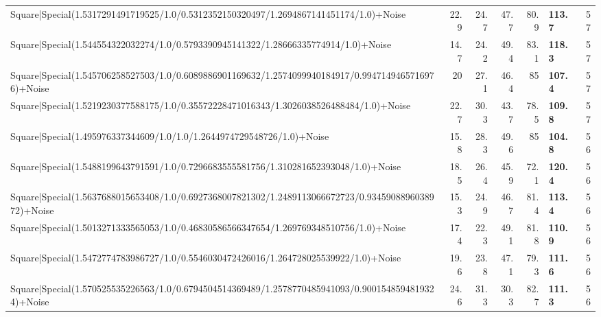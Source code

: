\begin{tabular}{lrrrrlr}
 Square|Special(1.5317291491719525/1.0/0.5312352150320497/1.2694867141451174/1.0)+Noise                                        &            22.9 &           24.7 &            47.7 &            80.9 & \textbf{113.7}  &           57 \\
 Square|Special(1.544554322032274/1.0/0.5793390945141322/1.28666335774914/1.0)+Noise                                           &            14.7 &           24.2 &            49.4 &            83.1 & \textbf{118.3}  &           57 \\
 Square|Special(1.545706258527503/1.0/0.6089886901169632/1.2574099940184917/0.9947149465716976)+Noise                          &            20   &           27.1 &            46.4 &            85   & \textbf{107.4}  &           57 \\
 Square|Special(1.5219230377588175/1.0/0.35572228471016343/1.3026038526488484/1.0)+Noise                                       &            22.7 &           30.3 &            43.7 &            78.5 & \textbf{109.8}  &           57 \\
 Square|Special(1.495976337344609/1.0/1.0/1.2644974729548726/1.0)+Noise                                                        &            15.8 &           28.3 &            49.6 &            85   & \textbf{104.8}  &           56 \\
 Square|Special(1.5488199643791591/1.0/0.7296683555581756/1.310281652393048/1.0)+Noise                                         &            18.5 &           26.4 &            45.9 &            72.1 & \textbf{120.4}  &           56 \\
 Square|Special(1.5637688015653408/1.0/0.6927368007821302/1.2489113066672723/0.9345908896038972)+Noise                         &            15.3 &           24.9 &            46.7 &            81.4 & \textbf{113.4}  &           56 \\
 Square|Special(1.5013271333565053/1.0/0.46830586566347654/1.269769348510756/1.0)+Noise                                        &            17.4 &           22.3 &            49.1 &            81.8 & \textbf{110.9}  &           56 \\
 Square|Special(1.5472774783986727/1.0/0.5546030472426016/1.264728025539922/1.0)+Noise                                         &            19.6 &           23.8 &            47.1 &            79.3 & \textbf{111.6}  &           56 \\
 Square|Special(1.570525535226563/1.0/0.6794504514369489/1.2578770485941093/0.9001548594819324)+Noise                          &            24.6 &           31.3 &            30.3 &            82.7 & \textbf{111.3}  &           56 \\

\end{tabular}
